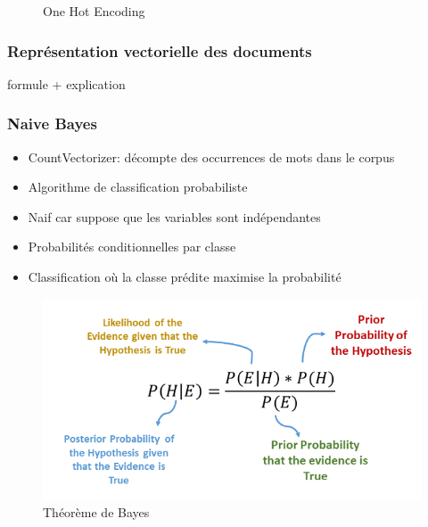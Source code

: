 \documentclass{beamer}
\begin{document}
\begin{frame}
\begin{figure}
\begin{minipage}[b]{0.45\textwidth}
        \caption{One Hot Encoding}
    \end{minipage}
\end{figure}
\end{frame}

\begin{frame}
\frametitle{Représentation vectorielle des documents}

formule + explication
\end{frame}

\begin{frame}
\frametitle{Naive Bayes}
\begin{itemize}
    \item CountVectorizer: décompte des occurrences de mots dans le corpus
    \item Algorithme de classification probabiliste
    \item Naif car suppose que les variables sont indépendantes
    \item Probabilités conditionnelles par classe
    \item Classification où la classe prédite maximise la probabilité
\end{itemize}

\begin{figure}
    \begin{minipage}[b]{0.60\textwidth}
        \centering
        \includegraphics[width=\textwidth]{nb.png} 
        \caption{Théorème de Bayes}
    \end{minipage}
\end{figure}
        
\end{frame}
\end{document}
